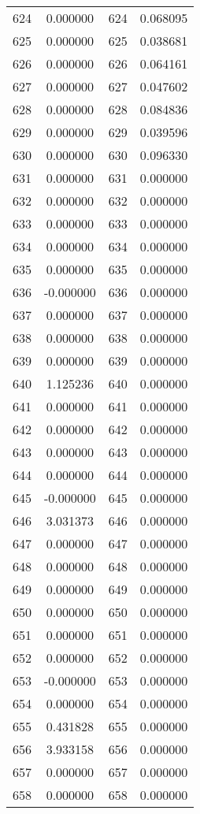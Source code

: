 \documentclass[12pt]{article}
\begin{document}
\begin{longtable}{@{}cccc@{}}
624 & 0.000000 & 624 & 0.068095 \\
625 & 0.000000 & 625 & 0.038681 \\
626 & 0.000000 & 626 & 0.064161 \\
627 & 0.000000 & 627 & 0.047602 \\
628 & 0.000000 & 628 & 0.084836 \\
629 & 0.000000 & 629 & 0.039596 \\
630 & 0.000000 & 630 & 0.096330 \\
631 & 0.000000 & 631 & 0.000000 \\
632 & 0.000000 & 632 & 0.000000 \\
633 & 0.000000 & 633 & 0.000000 \\
634 & 0.000000 & 634 & 0.000000 \\
635 & 0.000000 & 635 & 0.000000 \\
636 & -0.000000 & 636 & 0.000000 \\
637 & 0.000000 & 637 & 0.000000 \\
638 & 0.000000 & 638 & 0.000000 \\
639 & 0.000000 & 639 & 0.000000 \\
640 & 1.125236 & 640 & 0.000000 \\
641 & 0.000000 & 641 & 0.000000 \\
642 & 0.000000 & 642 & 0.000000 \\
643 & 0.000000 & 643 & 0.000000 \\
644 & 0.000000 & 644 & 0.000000 \\
645 & -0.000000 & 645 & 0.000000 \\
646 & 3.031373 & 646 & 0.000000 \\
647 & 0.000000 & 647 & 0.000000 \\
648 & 0.000000 & 648 & 0.000000 \\
649 & 0.000000 & 649 & 0.000000 \\
650 & 0.000000 & 650 & 0.000000 \\
651 & 0.000000 & 651 & 0.000000 \\
652 & 0.000000 & 652 & 0.000000 \\
653 & -0.000000 & 653 & 0.000000 \\
654 & 0.000000 & 654 & 0.000000 \\
655 & 0.431828 & 655 & 0.000000 \\
656 & 3.933158 & 656 & 0.000000 \\
657 & 0.000000 & 657 & 0.000000 \\
658 & 0.000000 & 658 & 0.000000 \\

\end{longtable}
\end{document}
